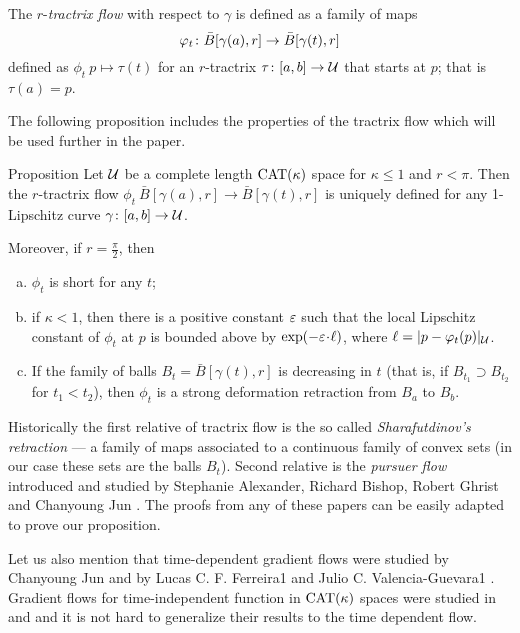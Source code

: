 \documentclass[oneside,a4paper, 12pt]{article}
\begin{document}
The $r$-\emph{tractrix flow} with respect to $\gamma$ is defined as a family of maps
\[\phi_t\:\bar B[\gamma(a),r]\z\to\bar B[\gamma(t),r]\] defined as $\phi_t\:p\mapsto \tau(t)$
for an $r$-tractrix $\tau\colon[a,b]\to \mathcal{U}$ that starts at $p$; that is $\tau(a)=p$.

The following proposition includes the properties of the tractrix flow which will be used further in the paper.

\begin{thm}{Proposition}\label{prop-def}
Let $\mathcal{U}$ be a complete length $\mathrm{CAT}(\kappa)$ space for $\kappa\le 1$ and $r<\pi$.
Then the $r$-tractrix flow $\phi_t\:\bar B[\gamma(a),r]\to\bar B[\gamma(t),r]$ is uniquely defined for any  1-Lipschitz curve $\gamma\colon[a,b]\to \mathcal{U}$.

Moreover, if $r=\tfrac\pi2$, then
\begin{enumerate}[(a)]
 \item $\phi_t$ is short for any $t$;
 \item\label{strict} if $\kappa<1$, then there is a positive constant $\varepsilon$ such that the local Lipschitz constant of $\phi_t$ at $p$ is bounded above by $\exp(-\eps\cdot\ell)$, where $\ell=|p-\varphi_t(p)|_{\mathcal{U}}$.
 \item\label{sharafutdinov} If the family of balls $B_t=\bar B[\gamma(t),r]$ is decreasing in $t$ (that is, if $B_{t_1}\supset B_{t_2}$ for $t_1<t_2$), then $\phi_t$ is a strong deformation retraction from $B_a$ to $B_b$.
\end{enumerate}
\end{thm}

Historically the first relative of tractrix flow
is the so called \emph{Sharafutdinov's retraction} \cite{sharafutdinov} --- a family of maps associated to a continuous family of convex sets (in our case these sets are the balls $B_t$). 
Second relative is the \emph{pursuer flow} introduced and studied by Stephanie Alexander, Richard Bishop, Robert Ghrist and Chanyoung Jun \cite{ABG,jun-thesis,jun,jun:grad}.
The proofs from any of these papers can be easily adapted to prove our proposition.

Let us also mention that time-dependent gradient flows were studied by Chanyoung Jun \cite{jun-thesis,jun:grad} and  by Lucas C. F. Ferreira1 and Julio C. Valencia-Guevara1 \cite{ferreira-valencia}.
Gradient flows for time-independent function in $\mathrm{CAT}(\kappa)$ spaces were studied in \cite{lytchak-open-map} and \cite{ohta-palfia} and it is not hard to generalize their results to the time dependent flow.
\end{document}

